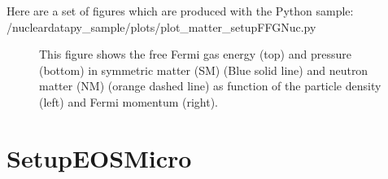 \documentclass[letterpaper,10pt,english]{sphinxmanual}
\begin{document}
\sphinxAtStartPar
Here are a set of figures which are produced with the Python sample: /nucleardatapy\_sample/plots/plot\_matter\_setupFFGNuc.py

\begin{figure}[htbp]
\centering
\capstart

\noindent{}
\caption{This figure shows the free Fermi gas energy (top) and pressure (bottom) in symmetric matter (SM) (Blue solid line) and neutron matter (NM) (orange dashed line) as function of the particle density (left) and Fermi momentum (right).}\label{\detokenize{source/api/setup_matter_ffg:id1}}\end{figure}

\sphinxstepscope


\section{SetupEOSMicro}
\label{\detokenize{source/api/setup_matter_micro:setupeosmicro}}\label{\detokenize{source/api/setup_matter_micro::doc}}\label{\detokenize{source/api/setup_matter_micro:module-nucleardatapy.matter.setup_micro}}
\end{document}
